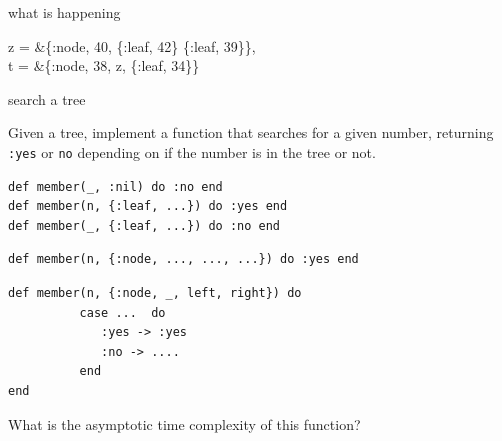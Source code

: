 \begin{frame}{what is happening}

\begin{code}
  z = &\{:node, 40, \{:leaf, 42\} \{:leaf, 39\}\},\\
  t = &\{:node, 38, z, \{:leaf, 34\}\}
\end{code}
\pause \vspace{20pt}


\end{frame}


\begin{frame}[fragile]{search a tree}

Given a tree, implement a function that searches for a given number,
returning {\tt :yes} or {\tt no} depending on if the number is in the
tree or not.

\pause\vspace{20pt}

\begin{verbatim}
def member(_, :nil) do :no end
def member(n, {:leaf, ...}) do :yes end
def member(_, {:leaf, ...}) do :no end
\end{verbatim}
\pause
\begin{verbatim}
def member(n, {:node, ..., ..., ...}) do :yes end
\end{verbatim}
\pause

\begin{verbatim}
def member(n, {:node, _, left, right}) do 
          case ...  do
             :yes -> :yes
             :no -> ....
          end
end
\end{verbatim}

\pause\vspace{20pt}
What is the asymptotic time complexity of this function?
\end{frame}


